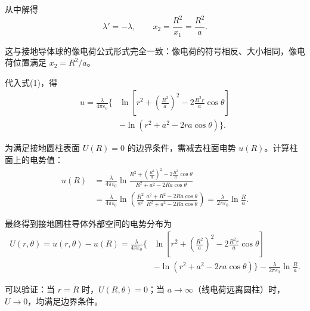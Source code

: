 \begin{solution}[接地无限长圆柱形导体的电势分布]
    从中解得
    \[
        \lambda' = -\lambda, \qquad x_2 = \frac{R^2}{x_1} = \frac{R^2}{a}.
    \]

    这与接地导体球的像电荷公式形式完全一致：像电荷的符号相反、大小相同，像电荷位置满足 $x_2 = R^2/a$。

    代入式(1)，得
    \[
        \begin{aligned}
            u = \frac{\lambda}{4\pi\varepsilon_0} \biggl\{
             & \ln\!\left[ r^2 + \left(\frac{R^2}{a}\right)^2 - 2\frac{R^2 r}{a}\cos\theta \right] \\
             & - \ln(r^2 + a^2 - 2ra\cos\theta) \biggr\}.
        \end{aligned}
    \]

    为满足接地圆柱表面 $U(R)=0$ 的边界条件，需减去柱面电势 $u(R)$。计算柱面上的电势值：
    \[
        \begin{aligned}
            u(R) & = \frac{\lambda}{4\pi\varepsilon_0}
            \ln\frac{R^2 + \left(\frac{R^2}{a}\right)^2 - 2\frac{R^3}{a}\cos\theta}
            {R^2 + a^2 - 2Ra\cos\theta}                \\
                 & = \frac{\lambda}{4\pi\varepsilon_0}
            \ln\!\left( \frac{R^2}{a^2} \,
            \frac{a^2 + R^2 - 2Ra\cos\theta}{R^2 + a^2 - 2Ra\cos\theta} \right)
            = \frac{\lambda}{2\pi\varepsilon_0} \ln\frac{R}{a}.
        \end{aligned}
    \]

    最终得到接地圆柱导体外部空间的电势分布为
    \[
        \begin{aligned}
            U(r,\theta) = u(r,\theta) - u(R)
            = \frac{\lambda}{4\pi\varepsilon_0} \biggl\{
             & \ln\!\left[ r^2 + \left(\frac{R^2}{a}\right)^2 - 2\frac{R^2 r}{a}\cos\theta \right] \\
             & - \ln(r^2 + a^2 - 2ra\cos\theta) \biggr\}
            - \frac{\lambda}{2\pi\varepsilon_0} \ln\frac{R}{a}.
        \end{aligned}
    \]

    可以验证：当 $r = R$ 时，$U(R,\theta) = 0$；当 $a \to \infty$（线电荷远离圆柱）时，$U \to 0$，均满足边界条件。
\end{solution}

